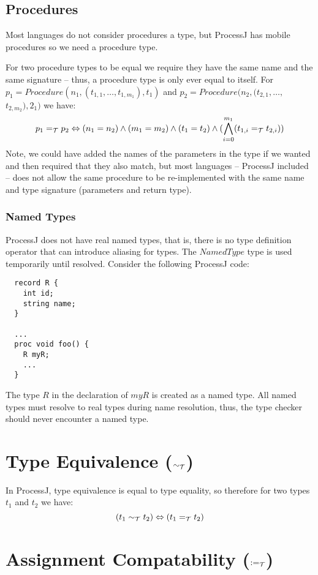 \documentclass[pdflatex,11pt,letter]{article}
\newcommand{\te}{=_{\cal T}}
\newcommand{\teq}{\sim_{\cal T}}
\newcommand{\ac}{:=_{\cal T}}
\begin{document}
\subsection{Procedures}

Most languages do not consider procedures a type, but ProcessJ has mobile procedures so we need a procedure type.

For two procedure types to be equal we require they have the same name and the same signature -- thus, a procedure type is only ever equal to itself. For $p_1 = Procedure(n_1,(t_{1,1},\ldots,t_{1,m_1}),t_1)$ and $p_2 = Procedure(n_2,(t_{2,1},\ldots,$ $t_{2,m_2}),2_1)$ we have:
\[
p_1 \te p_2 \Leftrightarrow (n_1 = n_2) \wedge (m_1 = m_2) \wedge (t_1 = t_2) \wedge (\bigwedge_{i=0}^{m_1} (t_{1,i} \te t_{2,i}))
\]
Note, we could have added the names of the parameters in the type if we wanted and then required that they also match, but most languages -- ProcessJ included -- does not allow the same procedure to be re-implemented with the same name and type signature (parameters and return type).

\subsubsection{Named Types}

ProcessJ does not have real named types, that is, there is no type definition operator that can introduce aliasing for types. The $NamedType$ type is used temporarily until resolved. Consider the following ProcessJ code:

\begin{verbatim}
  record R {
    int id;
    string name;
  }

  ...
  proc void foo() {
    R myR;
    ... 
  } 
\end{verbatim}

The type $R$ in the declaration of $myR$ is created as a named type. All named types must resolve to real types during name resolution, thus, the type checker should never encounter a named type.

\section{Type Equivalence ($\teq$)}

In ProcessJ, type equivalence is equal to type equality, so therefore for two types $t_1$ and $t_2$ we have:
\[
(t_1 \teq t_2) \Leftrightarrow (t_1 \te t_2)
\]

\section{Assignment Compatability ($\ac$)}
\end{document}
